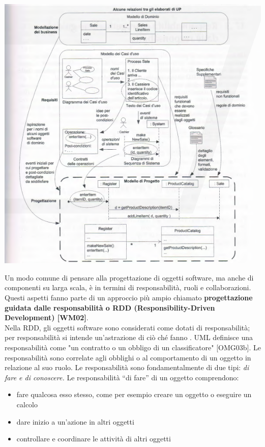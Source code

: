 \documentclass[a4paper,12pt, oneside]{book}
\begin{document}
\begin{center}
\includegraphics[scale = 0.7]{img/grasp.png}
\end{center}
Un modo comune di pensare alla progettazione di oggetti software, ma anche di componenti su larga scala, è in termini di responsabilità, ruoli e collaborazioni. Questi
aspetti fanno parte di un approccio più ampio chiamato \textbf{progettazione guidata dalle
  responsabilità o RDD (Responsibility-Driven Development) [WM02]}.\\
Nella RDD, gli oggetti software sono considerati come dotati di responsabilità; per responsabilità si intende un'astrazione di ciò ché fanno . UML definisce una responsabilità
come "un contratto o un obbligo di un classificatore" [OMG03b]. Le responsabilità
sono correlate agli obblighi o al comportamento di un oggetto in relazione al suo ruolo.
Le responsabilità sono fondamentalmente di due tipi: \textit{di fare e di conoscere.}
Le responsabilità ``di fare'' di un oggetto comprendono:
\begin{itemize}
\item fare qualcosa esso stesso, come per esempio creare un oggetto o eseguire un
calcolo
\item dare inizio a un'azione in altri oggetti
\item controllare e coordinare le attività di altri oggetti
\end{itemize}
\end{document}
